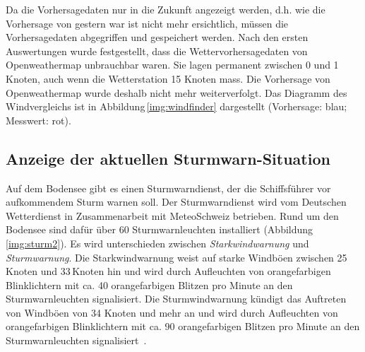 Da die Vorhersagedaten nur in die Zukunft angezeigt werden, d.h. wie die Vorhersage von gestern war ist nicht mehr ersichtlich, müssen die Vorhersagedaten abgegriffen und gespeichert werden. Nach den ersten Auswertungen wurde festgestellt, dass die Wettervorhersagedaten von Openweathermap unbrauchbar waren. Sie lagen permanent zwischen 0 und 1 Knoten, auch wenn die Wetterstation 15 Knoten mass. Die Vorhersage von Openweathermap wurde deshalb nicht mehr weiterverfolgt. Das Diagramm des Windvergleichs ist in Abbildung\,\ref{img:windfinder} dargestellt (Vorhersage: blau; Messwert: rot).





\subsection{Anzeige der aktuellen Sturmwarn-Situation}
\label{subsec:sturmwarnung}
Auf dem Bodensee gibt es einen Sturmwarndienst, der die Schiffsführer vor aufkommendem Sturm warnen soll. Der Sturmwarndienst wird vom Deutschen Wetterdienst in Zusammenarbeit mit MeteoSchweiz betrieben. Rund um den Bodensee sind dafür über 60 Sturmwarnleuchten installiert (Abbildung \ref{img:sturm2}). Es wird unterschieden zwischen \emph{Starkwindwarnung} und \emph{Sturmwarnung}. Die Starkwindwarnung weist auf starke Windböen zwischen 25\,Knoten und 33\,Knoten hin und wird durch Aufleuchten von orangefarbigen Blinklichtern mit ca. 40 orangefarbigen Blitzen pro Minute an den Sturmwarnleuchten signalisiert. Die Sturmwindwarnung kündigt das Auftreten von Windböen von 34 Knoten und mehr an und wird durch Aufleuchten von orangefarbigen Blinklichtern mit ca. 90 orangefarbigen Blitzen pro Minute an den Sturmwarnleuchten signalisiert~\cite{BSO1976}.

